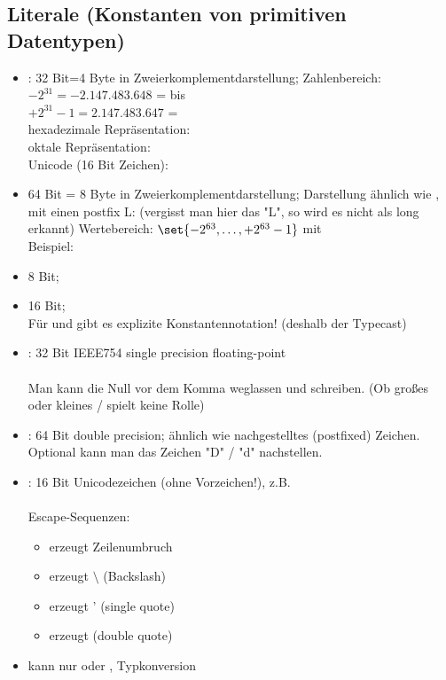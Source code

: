 \subsection{Literale (Konstanten von primitiven Datentypen)}
\begin{itemize}
	\item {}: 32 Bit=4 Byte in Zweierkomplementdarstellung; Zahlenbereich:\\
	$-2^{31}=-2.147.483.648$ =  bis\\ $+2^{31}-1=2.147.483.647$ = \\
	hexadezimale Repräsentation: \\
	oktale Repräsentation: \\
	Unicode (16 Bit Zeichen): 
	\item {} 64 Bit = 8 Byte in Zweierkomplementdarstellung;
	Darstellung ähnlich wie , mit einen postfix L:
	(vergisst man hier das "L", so wird es nicht als long erkannt)
	Wertebereich: $\set{-2^{63},\ldots,+2^{63}-1}$ mit\\
	Beispiel:
	\item {} 8 Bit; 
	\item {} 16 Bit; \\
	Für  und  gibt es  explizite Konstantennotation! (deshalb der Typecast)
	\item {}: 32 Bit IEEE754 single precision floating-point\\
	\\
	Man kann die Null vor dem Komma weglassen und  schreiben. 
	(Ob großes oder kleines  /  spielt keine Rolle)
	\item {}: 64 Bit double precision;
	ähnlich wie   nachgestelltes (postfixed) Zeichen.
	Optional kann man das Zeichen "D" / "d" nachstellen.
	\item {}: 16 Bit Unicodezeichen (ohne Vorzeichen!), z.B.\\ \\
	Escape-Sequenzen:
	\begin{itemize}
		\item {} erzeugt Zeilenumbruch 
		\item {} erzeugt $\setminus$ (Backslash)
		\item {} erzeugt ' (single quote)
		\item {} erzeugt \grqq{} (double quote)
	\end{itemize}
	\item {} kann nur  oder ,  Typkonversion
\end{itemize}

